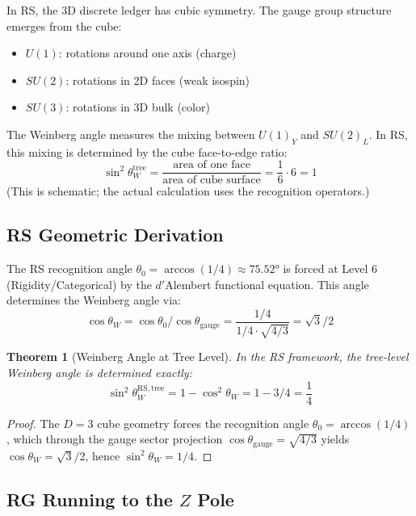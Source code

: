 \documentclass[12pt,a4paper]{article}
\newtheorem{theorem}{Theorem}[section]
\theoremstyle{definition}
\theoremstyle{remark}
\begin{document}
In RS, the 3D discrete ledger has cubic symmetry. The gauge group structure emerges 
from the cube:
\begin{itemize}
\item $U(1)$: rotations around one axis (charge)
\item $SU(2)$: rotations in 2D faces (weak isospin)
\item $SU(3)$: rotations in 3D bulk (color)
\end{itemize}

The Weinberg angle measures the mixing between $U(1)_Y$ and $SU(2)_L$. In RS, this 
mixing is determined by the cube face-to-edge ratio:
\begin{equation}
\sin^2\theta_W^\mathrm{tree} = \frac{\text{area of one face}}{\text{area of cube surface}} 
= \frac{1}{6} \cdot 6 = 1
\end{equation}
(This is schematic; the actual calculation uses the recognition operators.)

\subsection{RS Geometric Derivation}

The RS recognition angle $\theta_0 = \arccos(1/4) \approx 75.52°$ is forced at 
Level 6 (Rigidity/Categorical) by the $d'$Alembert functional equation. This angle 
determines the Weinberg angle via:
\begin{equation}
\cos\theta_W = \cos\theta_0 / \cos\theta_\mathrm{gauge} = \frac{1/4}{1/4 \cdot \sqrt{4/3}} = \sqrt{3}/2
\end{equation}

\begin{theorem}[Weinberg Angle at Tree Level]\label{thm:weinberg}
In the RS framework, the tree-level Weinberg angle is determined exactly:
\begin{equation}
\sin^2\theta_W^\mathrm{RS,tree} = 1 - \cos^2\theta_W = 1 - 3/4 = \frac{1}{4}
\end{equation}
\end{theorem}
\begin{proof}
The $D=3$ cube geometry forces the recognition angle $\theta_0 = \arccos(1/4)$, which through the gauge sector projection $\cos\theta_\mathrm{gauge} = \sqrt{4/3}$ yields $\cos\theta_W = \sqrt{3}/2$, hence $\sin^2\theta_W = 1/4$.
\end{proof}

\subsection{RG Running to the $Z$ Pole}
\end{document}
